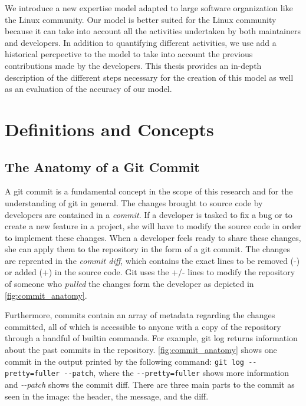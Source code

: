 We introduce a new expertise model adapted to large software organization like the Linux community. Our model is better suited for the Linux community because it can take into account all the activities undertaken by both maintainers and developers. In addition to quantifying different activities, we use add a historical percpective to the model to take into account the previous contributions made by the developers. This thesis provides an in-depth description of the different steps necessary for the creation of this model as well as an evaluation of the accuracy of our model. 





\section{Definitions and Concepts}  %

\subsection{The Anatomy of a Git Commit}
\label{sec:commit_anatomy}

A git commit is a fundamental concept in the scope of this research and for the understanding of git in general. The changes brought to source code by developers are contained in a \textit{commit}. If a developer is tasked to fix a bug or to create a new feature in a project, she will have to modify the source code in order to implement these changes. When a developer feels ready to share these changes, she can apply them to the repository in the form of a git commit. The changes are reprented in the \textit{commit diff}, which contains the exact lines to be removed (-) or added (+) in the source code. Git uses the +/- lines to modify the repository of someone who \textit{pulled} the changes form the developer as depicted in \autoref{fig:commit_anatomy}. 

Furthermore, commits contain an array of metadata regarding the changes committed, all of which is accessible to anyone with a copy of the repository through a handful of builtin commands. For example, git log returns information about the past commits in the repository. \autoref{fig:commit_anatomy} shows one commit in the output printed by the following command: \texttt{git log -{}-pretty=fuller -{}-patch}, where the \texttt{-{}-pretty=fuller} shows more information and \textit{-{}-patch} shows the commit diff. There are three main parts to the commit as seen in the image: the header, the  message, and the diff.

